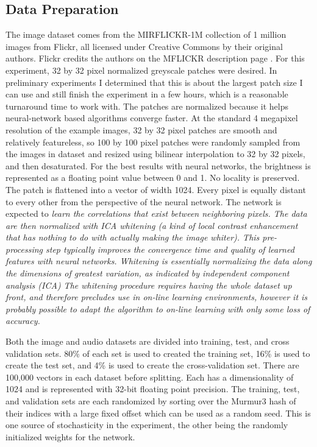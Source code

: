 \documentclass[12pt]{article}
\begin{document}
\begin{doublespacing}
	\subsection{Data Preparation}
	The image dataset comes from the MIRFLICKR-1M collection of 1 million images from Flickr, all licensed under Creative Commons by their original authors. Flickr credits the authors on the MFLICKR description page \cite{huiskes08}. For this experiment, 32 by 32 pixel normalized greyscale patches were desired. In preliminary experiments I determined that this is about the largest patch size I can use and still finish the experiment in a few hours, which is a reasonable turnaround time to work with. The patches are normalized because it helps neural-network based algorithms converge faster. At the standard 4 megapixel resolution of the example images, 32 by 32 pixel patches are smooth and relatively featureless, so 100 by 100 pixel patches were randomly sampled from the images in dataset and resized using bilinear interpolation to 32 by 32 pixels, and then desaturated. For the best results with neural networks, the brightness is represented as a floating point value between 0 and 1. No locality is preserved. The patch is flattened into a vector of width 1024. Every pixel is equally distant to every other from the perspective of the neural network. The network is expected to \em learn \em the correlations that exist between neighboring pixels. The data are then normalized with ICA whitening (a kind of local contrast enhancement that has nothing to do with actually making the image whiter). This pre-processing step typically improves the convergence time and quality of learned features with neural networks. Whitening is essentially normalizing the data along the dimensions of greatest variation, as indicated by independent component analysis (ICA) The whitening procedure requires having the whole dataset up front, and therefore precludes use in on-line learning environments, however it is probably possible to adapt the algorithm to on-line learning with only some loss of accuracy.
	
	Both the image and audio datasets are divided into training, test, and cross validation sets. 80\% of each set is used to created the training set, 16\% is used to create the test set, and 4\% is used to create the cross-validation set. There are 100,000 vectors in each dataset before splitting. Each has a dimensionality of 1024 and is represented with 32-bit floating point precision. The training, test, and validation sets are each randomized by sorting over the Murmur3 hash of their indices with a large fixed offset which can be used as a random seed. This is one source of stochasticity in the experiment, the other being the randomly initialized weights for the network.
	

\end{doublespacing}
\end{document}
